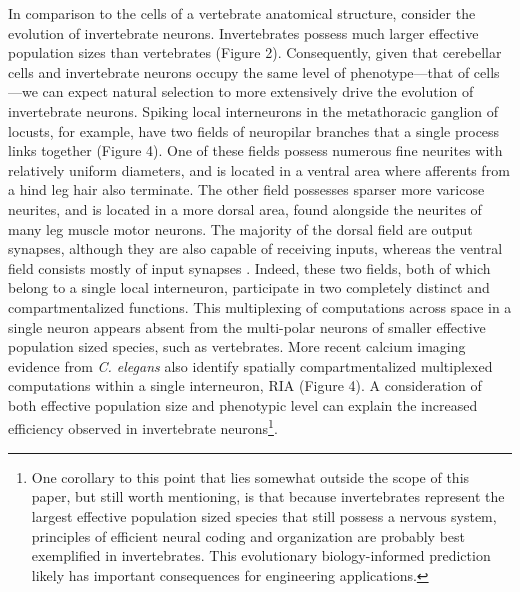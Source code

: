 \documentclass{article}
\begin{document}
In comparison to the cells of a vertebrate anatomical structure, consider the evolution of invertebrate neurons. Invertebrates possess much larger effective population sizes than vertebrates (Figure 2). Consequently, given that cerebellar cells and invertebrate neurons occupy the same level of phenotype---that of cells---we can expect natural selection to more extensively drive the evolution of invertebrate neurons. Spiking local interneurons in the metathoracic ganglion of locusts, for example, have two fields of neuropilar branches that a single process links together (Figure 4). One of these fields possess numerous fine neurites with relatively uniform diameters, and is located in a ventral area where afferents from a hind leg hair also terminate. The other field possesses sparser more varicose neurites, and is located in a more dorsal area, found alongside the neurites of many leg muscle motor neurons. The majority of the dorsal field are output synapses, although they are also capable of receiving inputs, whereas the ventral field consists mostly of input synapses \cite{watson_burrows_1985}. Indeed, these two fields, both of which belong to a single local interneuron, participate in two completely distinct and compartmentalized functions. This multiplexing of computations across space in a single neuron appears absent from the multi-polar neurons of smaller effective population sized species, such as vertebrates. More recent calcium imaging evidence from \textit{C. elegans} also identify spatially compartmentalized multiplexed computations within a single interneuron, RIA \cite{Hendricks_Ha_Maffey_Zhang_2012} (Figure 4). A consideration of both effective population size and phenotypic level can explain the increased efficiency observed in invertebrate neurons\footnote{One corollary to this point that lies somewhat outside the scope of this paper, but still worth mentioning, is that because invertebrates represent the largest effective population sized species that still possess a nervous system, principles of efficient neural coding and organization are probably best exemplified in invertebrates. This evolutionary biology-informed prediction likely has important consequences for engineering applications.}. 
\end{document}
